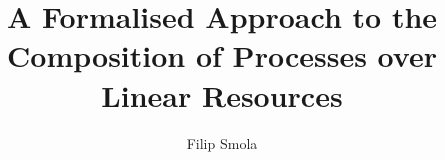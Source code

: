\documentclass{smolathesis}
\title{A Formalised Approach to the Composition of Processes over Linear Resources}
\author{Filip Smola}
\begin{document}
\begin{preliminary}

\maketitle

\begin{laysummary}
  
\end{laysummary}

\begin{acknowledgements}
  
\end{acknowledgements}

\standarddeclaration

\tableofcontents

\end{preliminary}










\appendix





\end{document}
